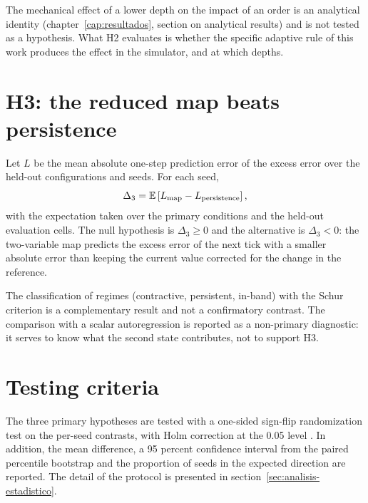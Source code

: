 The mechanical effect of a lower depth on the impact of an order is an analytical identity (chapter~\ref{cap:resultados}, section on analytical results) and is not tested as a hypothesis. What H2 evaluates is whether the specific adaptive rule of this work produces the effect in the simulator, and at which depths.

\section{H3: the reduced map beats persistence}

Let $L$ be the mean absolute one-step prediction error of the excess error over the held-out configurations and seeds. For each seed,
\[
\Delta_3 = \mathbb{E}\left[L_{\text{map}} - L_{\text{persistence}}\right],
\]
with the expectation taken over the primary conditions and the held-out evaluation cells. The null hypothesis is $\Delta_3\ge 0$ and the alternative is $\Delta_3<0$: the two-variable map predicts the excess error of the next tick with a smaller absolute error than keeping the current value corrected for the change in the reference.

The classification of regimes (contractive, persistent, in-band) with the Schur criterion is a complementary result and not a confirmatory contrast. The comparison with a scalar autoregression is reported as a non-primary diagnostic: it serves to know what the second state contributes, not to support H3.

\section{Testing criteria}

The three primary hypotheses are tested with a one-sided sign-flip randomization test on the per-seed contrasts, with Holm correction at the 0.05 level \cite{holm1979simple}. In addition, the mean difference, a 95 percent confidence interval from the paired percentile bootstrap \cite{efron1979bootstrap} and the proportion of seeds in the expected direction are reported. The detail of the protocol is presented in section~\ref{sec:analisis-estadistico}.
